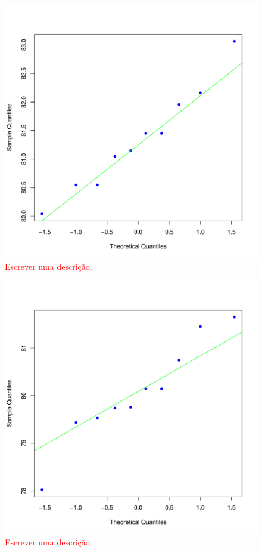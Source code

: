 \documentclass[conference]{IEEEtran}
\begin{document}
\begin{figure}[h]
	\centering
	\includegraphics[width=\linewidth]{img/bluenorm_cmfdr.pdf}
	\caption{\textcolor{red}{Escrever uma descrição}.}
	\label{fig:hist_cmfdr}
\end{figure}

\begin{figure}[h]
	\centering
	\includegraphics[width=\linewidth]{img/bluenorm_mfdr.pdf}
	\caption{\textcolor{red}{Escrever uma descrição}.}
	\label{fig:hist_mfdr}
\end{figure}
\end{document}
